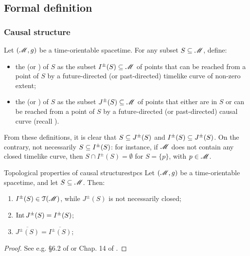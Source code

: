 \subsection{Formal definition}

\subsubsection{Causal structure}

Let $ (\mathscr{M} , g) $ be a time-orientable spacetime. For any subset $ S \subseteq \mathscr{M} $, define:
\begin{itemize}
  \item the  (or ) of $ S $ as the subset $ I^\pm(S) \subseteq \mathscr{M} $ of points that can be reached from a point of $ S $ by a future-directed (or past-directed) timelike curve of non-zero extent;
  \item the  (or ) of $ S $ as the subset $ J^\pm(S) \subseteq \mathscr{M} $ of points that either are in $ S $ or can be reached from a point of $ S $ by a future-directed (or past-directed) causal curve (recall ).
\end{itemize}

From these definitions, it is clear that $ S \subseteq J^\pm(S) $ and $ I^\pm(S) \subseteq J^\pm(S) $. On the contrary, not necessarily $ S \subseteq I^\pm(S) $: for instance, if $ \mathscr{M} $ does not contain any closed timelike curve, then $ S \cap I^\pm(S) = \emptyset $ for $ S = \{p\} $, with $ p \in \mathscr{M} $.

\begin{lemma}{Topological properties of causal structures}{tpcs}
  Let $ (\mathscr{M} , g) $ be a time-orientable spacetime, and let $ S \subseteq \mathscr{M} $. Then:
  \begin{enumerate}
    \item \label{item:tpcs-1} $ I^\pm(S) \in \EuScript{T}(\mathscr{M}) $, while $ J^\pm(S) $ is not necessarily closed;
    \item \label{item:tpcs-2} $ \operatorname{Int} J^\pm(S) = I^\pm(S) $;
    \item \label{item:tpcs-3} $ \overline{J^\pm(S)} = \overline{I^\pm(S)} $;
  \end{enumerate}
\end{lemma}

\begin{proofbox}
  \begin{proof}
    See e.g. \S 6.2 of \cite{hawking-hellis} or Chap. 14 of \cite{oneill-1}.
  \end{proof}
\end{proofbox}

